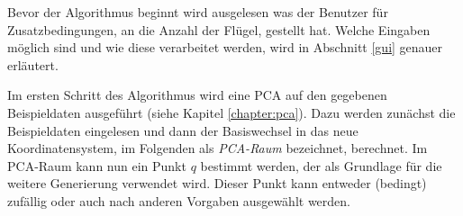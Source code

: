 \vspace{0.1cm}

Bevor der Algorithmus beginnt wird ausgelesen was der Benutzer für Zusatzbedingungen, \zb an die Anzahl der Flügel, gestellt hat. Welche Eingaben möglich sind und wie diese verarbeitet werden, wird in Abschnitt \ref{gui} genauer erläutert.

Im ersten Schritt des Algorithmus wird eine PCA auf den gegebenen Beispieldaten ausgeführt (siehe Kapitel \ref{chapter:pca}). Dazu werden zunächst die Beispieldaten eingelesen und dann der Basiswechsel in das neue Koordinatensystem, im Folgenden als \emph{PCA-Raum} bezeichnet, berechnet.
Im PCA-Raum kann nun ein Punkt $q$ bestimmt werden, der als Grundlage für die weitere Generierung verwendet wird. Dieser Punkt kann entweder (bedingt) zufällig oder auch nach anderen Vorgaben ausgewählt werden. 

